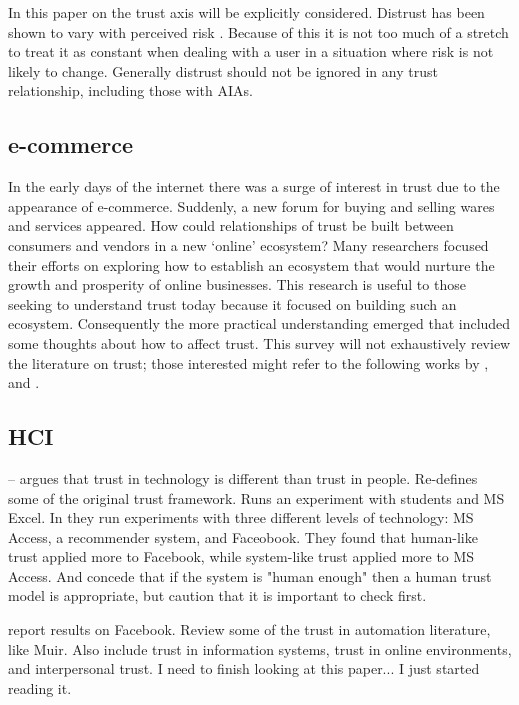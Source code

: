         In this paper on the trust axis will be explicitly considered. Distrust has been shown to vary with perceived risk \cite{Harrison_McKnight2004}. Because of this it is not too much of a stretch to treat it as constant when dealing with a user in a situation where risk is not likely to change. Generally distrust should not be ignored in any trust relationship, including those with AIAs.

\subsection{e-commerce}
    In the early days of the internet there was a surge of interest in trust due to the appearance of e-commerce. Suddenly, a new forum for buying and selling wares and services appeared. How could relationships of trust be built between consumers and vendors in a new `online' ecosystem? Many researchers focused their efforts on exploring how to establish an ecosystem that would nurture the growth and prosperity of online businesses. This research is useful to those seeking to understand trust today because it focused on building such an ecosystem. Consequently the more practical understanding emerged that included some thoughts about how to affect trust. This survey will not exhaustively review the literature on trust; those interested might refer to the following works by \citet{McKnight2001-fa}, and \citet{Lewicki2006-hj}.

\subsection{HCI}
    \cite{Mcknight2011-gv} -- argues that trust in technology is different than trust in people. Re-defines some of the original trust framework. Runs an experiment with students and MS Excel. In \cite{Tripp2011-cq} they run experiments with three different levels of technology: MS Access, a recommender system, and Faceobook. They found that human-like trust applied more to Facebook, while system-like trust applied more to MS Access. And concede that if the system is "human enough" then a human trust model is appropriate, but caution that it is important to check first.

    \cite{Lankton2008-ct} report results on Facebook. Review some of the trust in automation literature, like Muir. Also include trust in information systems, trust in online environments, and interpersonal trust. I need to finish looking at this paper... I just started reading it.

